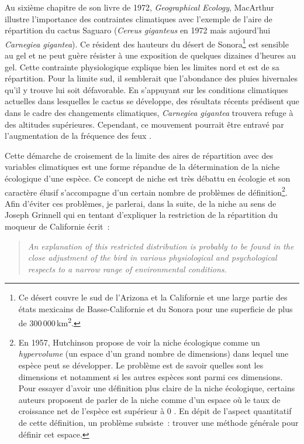 Au sixième chapitre de son livre de 1972, \emph{Geographical Ecology},
MacArthur illustre l'importance des contraintes climatiques avec
l'exemple de l'aire de répartition du cactus Saguaro (\emph{Cereus
giganteus} en 1972 mais aujourd'hui \emph{Carnegiea gigantea}). Ce
résident des hauteurs du désert de Sonora\footnote{Ce désert couvre le
  sud de l'Arizona et la Californie et une large partie des états
  mexicains de Basse-Californie et du Sonora pour une superficie de plus
  de 300 000 km\textsuperscript{2}.} est sensible au gel et ne peut
guère résister à une exposition de quelques dizaines d'heures au gel.
Cette contrainte physiologique explique bien les limites nord et est de
sa répartition. Pour la limite sud, il semblerait que l'abondance des
pluies hivernales qu'il y trouve lui soit défavorable. En s'appuyant sur
les conditions climatiques actuelles dans lesquelles le cactus se
développe, des résultats récents prédisent que dans le cadre des
changements climatiques, \emph{Carnegiea gigantea} trouvera refuge à des
altitudes supérieures. Cependant, ce mouvement pourrait être entravé par
l'augmentation de la fréquence des feux \citep{Springer2015}.

Cette démarche de croisement de la limite des aires de répartition avec
des variables climatiques est une forme répandue de la détermination de
la niche écologique d'une espèce. Ce concept de niche est très débattu
en écologie et son caractère élusif s'accompagne d'un certain nombre de
problèmes de définition\footnote{En 1957, Hutchinson propose de voir la
  niche écologique comme un \emph{hypervolume} (un espace d'un grand
  nombre de dimensions) dans lequel une espèce peut se développer. Le
  problème est de savoir quelles sont les dimensions et notamment si les
  autres espèces sont parmi ces dimensions. Pour essayer d'avoir une
  définition plus claire de la niche écologique, certains auteurs
  proposent de parler de la niche comme d'un espace où le taux de
  croissance net de l'espèce est supérieur à 0 \citep{Chase2003}. En
  dépit de l'aspect quantitatif de cette définition, un problème
  subsiste~: trouver une méthode générale pour définir cet espace.}.
Afin d'éviter ces problèmes, je parlerai, dans la suite, de la niche au
sens de Joseph Grinnell qui en tentant d'expliquer la restriction de la
répartition du moqueur de Californie écrit~:

\begin{quote}
\emph{An explanation of this restricted distribution is probably to be
found in the close adjustment of the bird in various physiological and
psychological respects to a narrow range of environmental conditions}.
\end{quote}

